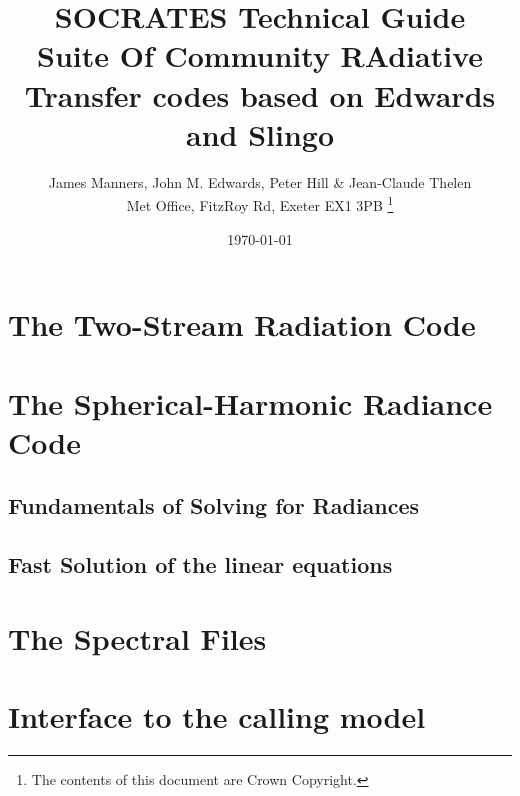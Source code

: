 \documentclass[11pt,a4paper,english,twoside,openright]{book}
\begin{document}

\pagestyle{empty}

\newcommand{\um}{$\mu$m}

\newcommand{\bx}{\mathbf{x}}
\newcommand{\bn}{\mathbf{n}}
\newcommand{\bnp}{\mathbf{n}'}

\title{SOCRATES Technical Guide\\
Suite Of Community RAdiative Transfer codes based on Edwards and Slingo}
\date{\today}

\author{James Manners, John M. Edwards, Peter Hill \& Jean-Claude Thelen\\
Met Office, FitzRoy Rd, Exeter EX1 3PB
\thanks{
 The contents of this document are Crown Copyright.
}}
\maketitle

\tableofcontents

\clearpage

\pagestyle{fancy}
\latex{
\fancyhf{}
\fancyhead[LE,RO]{\thepage}
\fancyhead[LO]{\nouppercase{\rightmark}}
\fancyhead[RE]{\nouppercase{\leftmark}}
}

\chapter{The Two-Stream Radiation Code}
\label{sec:twostream}


\chapter{The Spherical-Harmonic Radiance Code}
\label{sec:radiance}
\section{Fundamentals of Solving for Radiances}

\section{Fast Solution of the linear equations}


\chapter{The Spectral Files}
\label{sec:spec}
 
 
 

\chapter{Interface to the calling model}
\label{sec:interface}




\end{document}

